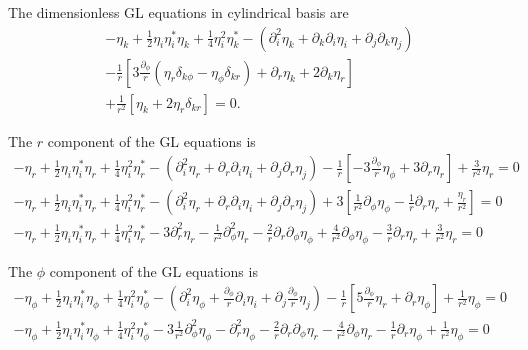 \documentclass[aps,prl,preprint]{revtex4-2}
\begin{document}
The dimensionless GL equations in cylindrical basis are
\begin{align}
    -\eta_k+\frac{1}{2}\eta_i\eta_i^*\eta_k
    +\frac{1}{4}\eta_i^2\eta_k^*
    -(\partial_i^2\eta_k
    +\partial_k\partial_i\eta_i
    +\partial_j\partial_k\eta_j)\nonumber \\
    -\frac{1}{r}\left[3\frac{\partial_\phi}{r}
        \left(\eta_r\delta_{k\phi}-\eta_\phi\delta_{kr}\right)+\partial_r\eta_k
    +2\partial_k\eta_r\right]\nonumber    \\
    +\frac{1}{r^2}\left[\eta_k+2\eta_r\delta_{kr}\right]=0.
\end{align}

The $r$ component of the GL equations is
\begin{align}
    -\eta_r+\frac{1}{2}\eta_i\eta_i^*\eta_r
    +\frac{1}{4}\eta_i^2\eta_r^*
    -(\partial_i^2\eta_r
    +\partial_r\partial_i\eta_i
    +\partial_j\partial_r\eta_j)
    -\frac{1}{r}\left[-3\frac{\partial_\phi}{r}\eta_\phi
        +3\partial_r\eta_r\right]
    +\frac{3}{r^2}\eta_r=0 \nonumber                                     \\
    -\eta_r+\frac{1}{2}\eta_i\eta_i^*\eta_r
    +\frac{1}{4}\eta_i^2\eta_r^*
    -(\partial_i^2\eta_r
    +\partial_r\partial_i\eta_i
    +\partial_j\partial_r\eta_j)
    +3\left[\frac{1}{r^2}\partial_\phi\eta_\phi
    -\frac{1}{r}\partial_r\eta_r + \frac{\eta_r}{r^2}\right]=0 \nonumber \\
    -\eta_r+\frac{1}{2}\eta_i\eta_i^*\eta_r
    +\frac{1}{4}\eta_i^2\eta_r^*
    -3\partial_r^2\eta_r - \frac{1}{r^2}\partial_\phi^2\eta_r
    -\frac{2}{r}\partial_r\partial_\phi\eta_\phi
    +\frac{4}{r^2}\partial_\phi\eta_\phi
    -\frac{3}{r}\partial_r\eta_r + \frac{3}{r^2}\eta_r=0 \nonumber
\end{align}

The $\phi$ component of the GL equations is
\begin{align}
    -\eta_\phi+\frac{1}{2}\eta_i\eta_i^*\eta_\phi
    +\frac{1}{4}\eta_i^2\eta_\phi^*
    -\left(\partial_i^2\eta_\phi
    +\frac{\partial_\phi}{r}\partial_i\eta_i
    +\partial_j\frac{\partial_\phi}{r}\eta_j\right)
    -\frac{1}{r}\left[5\frac{\partial_\phi}{r}\eta_r
        +\partial_r\eta_\phi\right]
    +\frac{1}{r^2}\eta_\phi=0\nonumber \\
    -\eta_\phi+\frac{1}{2}\eta_i\eta_i^*\eta_\phi
    +\frac{1}{4}\eta_i^2\eta_\phi^*
    -3\frac{1}{r^2}\partial_\phi^2\eta_\phi
    -\partial_r^2\eta_\phi
    -\frac{2}{r}\partial_r\partial_\phi\eta_r
    -\frac{4}{r^2}\partial_\phi\eta_r
    -\frac{1}{r}\partial_r\eta_\phi
    +\frac{1}{r^2}\eta_\phi=0\nonumber
\end{align}
\end{document}
